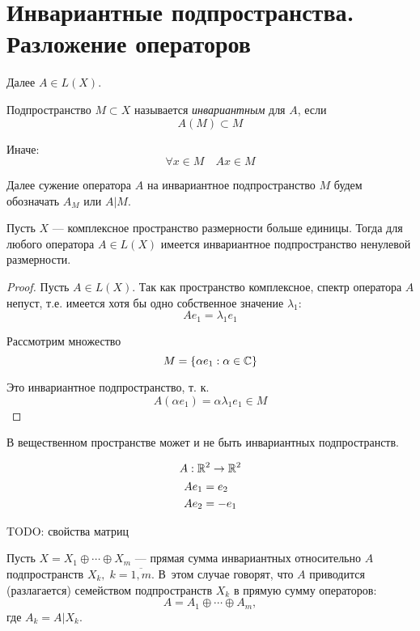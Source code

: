 \section{Инвариантные подпространства. Разложение операторов}
Далее $A \in L(X)$.

\begin{definition}
    Подпространство $ M \subset X $ называется \emph{инвариантным} для $A$, если
    \[ A(M) \subset M \]

    Иначе:
    \[ \forall x \in M \quad Ax \in M \]
\end{definition}

Далее сужение оператора $A$ на инвариантное подпространство $M$ будем обозначать
$A_M$ или $A \vert M $.

\begin{theorem} \label{th:invariantexists}
    Пусть $X$ — комплексное пространство размерности больше единицы. Тогда для
    любого оператора $A \in L(X)$ имеется инвариантное подпространство ненулевой
    размерности.
\end{theorem}
\begin{proof}
    Пусть $A\in L(X)$. Так как пространство комплексное, спектр оператора $A$
    непуст, т.е. имеется хотя бы одно собственное значение $\lambda_1$:
    \[ Ae_1 = \lambda_1 e_1 \]
    
    Рассмотрим множество
    \[ M = \left\{ \alpha e_1 : \alpha \in \mathbb{C} \right\} \]

    Это инвариантное подпространство, т. к.
    \[  A(\alpha e_1) = \alpha \lambda_1 e_1 \in M \]
\end{proof}

\begin{remark}
    В вещественном пространстве может и не быть инвариантных подпространств.
\end{remark}
\begin{example}
    \begin{gather*}
        A : \mathbb{R}^2 \to \mathbb{R}^2 \\  
        \begin{aligned}
            A e_1 &= e_2 \\
            A e_2 &= -e_1
        \end{aligned}
    \end{gather*}
\end{example}

TODO: свойства матриц

\begin{definition}
    Пусть $X = X_1 \oplus \dotsb \oplus X_m$ — прямая сумма инвариантных
    относительно $A$ подпространств $X_k, \; k = \overline{1,m}$. В~этом 
    случае говорят, что $A$ приводится (разлагается) семейством
    подпространств $X_k$ в прямую сумму операторов:
    \[ A = A_1 \oplus \dotsb \oplus A_m, \]
    где $A_k = A \vert X_k$.
\end{definition}

